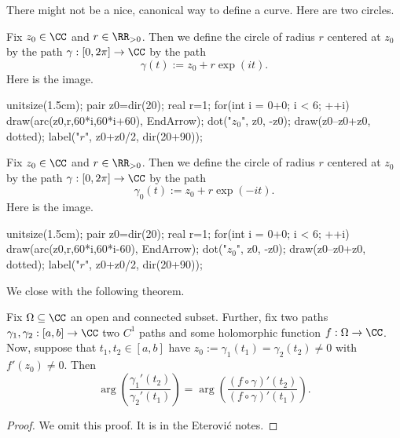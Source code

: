 There might not be a nice, canonical way to define a curve. Here are two circles.
\begin{example}
	Fix $z_0\in\CC$ and $r\in\RR_{>0}$. Then we define the circle of radius $r$ centered at $z_0$ by the path $\gamma:[0,2\pi]\to\CC$ by the path
	\[\gamma(t):=z_0+r\exp(it).\]
	Here is the image.
	\begin{center}
		\begin{asy}
			unitsize(1.5cm);
			pair z0=dir(20);
			real r=1;
			for(int i = 0+0; i < 6; ++i)
				draw(arc(z0,r,60*i,60*i+60), EndArrow);
			dot("$z_0$", z0, -z0);
			draw(z0--z0+z0, dotted);
			label("$r$", z0+z0/2, dir(20+90));
		\end{asy}
	\end{center}
\end{example}
\begin{example}
	Fix $z_0\in\CC$ and $r\in\RR_{>0}$. Then we define the circle of radius $r$ centered at $z_0$ by the path $\gamma:[0,2\pi]\to\CC$ by the path
	\[\gamma_0(t):=z_0+r\exp(-it).\]
	Here is the image.
	\begin{center}
		\begin{asy}
			unitsize(1.5cm);
			pair z0=dir(20);
			real r=1;
			for(int i = 0+0; i < 6; ++i)
				draw(arc(z0,r,60*i,60*i-60), EndArrow);
			dot("$z_0$", z0, -z0);
			draw(z0--z0+z0, dotted);
			label("$r$", z0+z0/2, dir(20+90));
		\end{asy}
	\end{center}
\end{example}
We close with the following theorem.
\begin{theorem}
	Fix $\Omega\subseteq\CC$ an open and connected subset. Further, fix two paths $\gamma_1,\gamma_2:[a,b]\to\CC$ two $C^1$ paths and some holomorphic function $f:\Omega\to\CC$. Now, suppose that $t_1,t_2\in[a,b]$ have $z_0:=\gamma_1(t_1)=\gamma_2(t_2)\ne0$ with $f'(z_0)\ne0$. Then
	\[\arg\left(\frac{\gamma_1'(t_2)}{\gamma_2'(t_1)}\right)=\arg\left(\frac{(f\circ\gamma)'(t_2)}{(f\circ\gamma)'(t_1)}\right).\]
\end{theorem}
\begin{proof}
	We omit this proof. It is in the Eterovi\'c notes.
\end{proof}